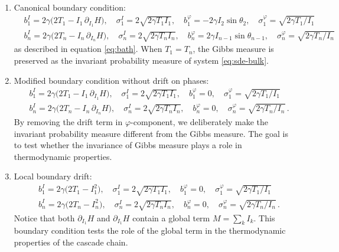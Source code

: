 \documentclass[11pt,a4paper]{article}
\theoremstyle{definition}
\numberwithin{equation}{section}   %
\begin{document}
\begin{enumerate}
    \item Canonical boundary condition: 
\begin{align}
    \label{eq:BC1}
    &b^{I}_1 = 2\gamma\big(2T_1 - I_1\,\partial_{I_1}H\big),\quad
  \sigma^{I}_1 = 2\sqrt{2\gamma T_1 I_1},\quad
  b^{\varphi}_1 = -2\gamma I_2 \sin\theta_2,\quad
  \sigma^{\varphi}_1 = \sqrt{2\gamma T_1/I_1}\\\nonumber
  &b^{I}_n = 2\gamma\big(2T_n - I_n\,\partial_{I_n}H\big),\quad
  \sigma^{I}_n = 2\sqrt{2\gamma T_n I_n},\quad
  b^{\varphi}_n = 2\gamma I_{n-1} \sin\theta_{n-1},\quad
  \sigma^{\varphi}_n = \sqrt{2\gamma T_n/I_n} \nonumber
\end{align}
    as described in equation \eqref{eq:bath}. When $T_1 = T_n$, the Gibbs measure is preserved as the invariant probability measure of system \eqref{eq:sde-bulk}.
    \item Modified boundary condition without drift on phases: 
\begin{align}
    \label{eq:BC2}
    &b^{I}_1 = 2\gamma\big(2T_1 - I_1\,\partial_{I_1}H\big),\quad
  \sigma^{I}_1 = 2\sqrt{2\gamma T_1 I_1},\quad
  b^{\varphi}_1 = 0,\quad
  \sigma^{\varphi}_1 = \sqrt{2\gamma T_1/I_1}\\\nonumber
  &b^{I}_n = 2\gamma\big(2T_n - I_n\,\partial_{I_n}H\big),\quad
  \sigma^{I}_n = 2\sqrt{2\gamma T_n I_n},\quad
  b^{\varphi}_n = 0,\quad
  \sigma^{\varphi}_n = \sqrt{2\gamma T_n/I_n} \nonumber \,.
\end{align}
By removing the drift term in $\varphi$-component, we deliberately make the invariant probability measure different from the Gibbs measure. The goal is to test whether the invariance of Gibbs measure plays a role in thermodynamic properties. 
\item Local boundary drift:
\begin{align}
    \label{eq:BC3}
    &b^{I}_1 = 2\gamma\big(2T_1 - I_1^2\big),\quad
  \sigma^{I}_1 = 2\sqrt{2\gamma T_1 I_1},\quad
  b^{\varphi}_1 = 0,\quad
  \sigma^{\varphi}_1 = \sqrt{2\gamma T_1/I_1}\\\nonumber
  &b^{I}_n = 2\gamma\big(2T_n - I_n^2\big),\quad
  \sigma^{I}_n = 2\sqrt{2\gamma T_n I_n},\quad
  b^{\varphi}_n = 0,\quad
  \sigma^{\varphi}_n = \sqrt{2\gamma T_n/I_n} \nonumber \,.
\end{align}
Notice that both $\partial_{I_1} H$ and $\partial_{I_1} H$ contain a global term $M = \sum_k I_k$. This boundary condition tests the role of the global term in the thermodynamic properties of the cascade chain. 
\end{enumerate}
\end{document}
